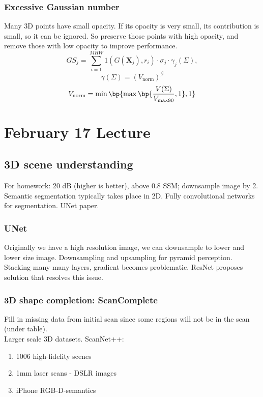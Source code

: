 \documentclass[11pt, oneside]{book}
\begin{document}
\subsection{Excessive Gaussian number}
Many 3D points have small opacity. If its opacity is very small, its contribution is small, so it can be ignored. So preserve those points with high opacity, and remove those with low opacity to improve performance.  
\[
  GS_j = \sum_{i=1}^{MHW} 1(G(\mathbf{X}_j), r_i) \cdot \sigma_j \cdot \gamma_j (\Sigma),
\]
\[
  \gamma(\Sigma) = (V_{\text{norm}})^\beta 
\]
\[
  V_{\text{norm}} = \min \bp{\max{\bp{\frac{V(\Sigma)}{V_\text{max90}},1},1}}
\] 

\chapter{February 17 Lecture}
\section{3D scene understanding}
For homework: 20 dB (higher is better), above 0.8 SSM; downsample image by 2. \\ 

\noindent Semantic segmentation typically takes place in 2D. Fully convolutional networks for segmentation. UNet paper. 
\subsection{UNet}
Originally we have a high resolution image, we can downsample to lower and lower size image. Downsampling and upsampling for pyramid perception. Stacking many many layers, gradient becomes problematic.  
ResNet proposes solution that resolves this issue. 
\subsection{3D shape completion: ScanComplete}
Fill in missing data from initial scan since some regions will not be in the scan (under table). \\ 

\noindent Larger scale 3D datasets. ScanNet++:
\begin{enumerate}[topsep=5pt, itemsep=1pt]
  \item 1006 high-fidelity scenes 
  \item 1mm laser scans - DSLR images 
  \item iPhone RGB-D-semantics
\end{enumerate}
\end{document}

